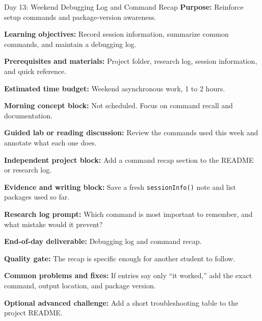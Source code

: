\begin{dailybox}{Day 13: Weekend Debugging Log and Command Recap}
\textbf{Purpose:} Reinforce setup commands and package-version awareness.

\textbf{Learning objectives:} Record session information, summarize common commands, and maintain a debugging log.

\textbf{Prerequisites and materials:} Project folder, research log, session information, and quick reference.

\textbf{Estimated time budget:} Weekend asynchronous work, 1 to 2 hours.

\textbf{Morning concept block:} Not scheduled. Focus on command recall and documentation.

\textbf{Guided lab or reading discussion:} Review the commands used this week and annotate what each one does.

\textbf{Independent project block:} Add a command recap section to the README or research log.

\textbf{Evidence and writing block:} Save a fresh \texttt{sessionInfo()} note and list packages used so far.

\textbf{Research log prompt:} Which command is most important to remember, and what mistake would it prevent?

\textbf{End-of-day deliverable:} Debugging log and command recap.

\textbf{Quality gate:} The recap is specific enough for another student to follow.

\textbf{Common problems and fixes:} If entries say only ``it worked,'' add the exact command, output location, and package version.

\textbf{Optional advanced challenge:} Add a short troubleshooting table to the project README.
\end{dailybox}

